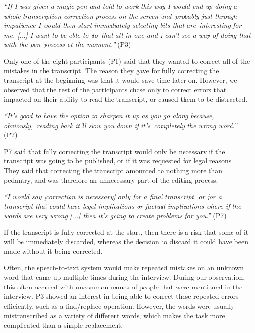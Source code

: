 \textit{``If I was given a magic pen and told to work this way I would end up doing a whole transcription correction
  process on the screen and probably just through impatience I would then start immediately selecting bits that
  are interesting for me. [...] I want to be able to do that all in one and I can't see a way of doing that with the
pen process at the moment.''} (P3)

Only one of the eight participants (P1) said that they wanted to correct all of the mistakes in the transcript. The
reason they gave for fully correcting the transcript at the beginning was that it would save time later on. However,
we observed that the rest of the participants chose only to correct errors that impacted on their ability to read the
transcript, or caused them to be distracted.

\textit{``It's good to have the option to sharpen it up as you go along because, obviously, reading back it'll slow
you down if it's completely the wrong word.''} (P2)

P7 said that fully correcting the transcript would only be necessary if the transcript was going to be
published, or if it was requested for legal reasons. They said that correcting the transcript amounted to nothing more
than pedantry, and was therefore an unnecessary part of the editing process.

\textit{``I would say [correction is necessary] only for a final transcript, or for a transcript that could have legal
  implications or factual implications where if the words are very wrong [...]
then it's going to create problems for you.''} (P7)

If the transcript is fully corrected at the start, then there is a risk that some of it will be immediately discarded,
whereas the decision to discard it could have been made without it being corrected.



Often, the speech-to-text system would make repeated mistakes on an unknown word that came up multiple times during the
interview. During our observation, this often occured with uncommon names of people that were mentioned in the
interview. P3 showed an interest in being able to correct these repeated errors efficiently, such as a find/replace
operation. However, the words were usually mistranscribed as a variety of different words, which makes the task more
complicated than a simple replacement.

